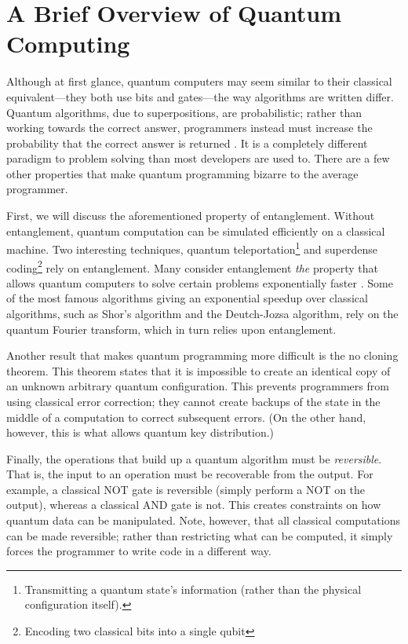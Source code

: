 \documentclass[]{article}
\begin{document}
\section{A Brief Overview of Quantum Computing}
Although at first glance, quantum computers may seem similar to their classical equivalent---they both use bits and gates---the way algorithms are written differ. Quantum algorithms, due to superpositions, are probabilistic; rather than working towards the correct answer, programmers instead must increase the probability that the correct answer is returned \cite{nannicini2017}. It is a completely different paradigm to problem solving than most developers are used to. There are a few other properties that make quantum programming bizarre to the average programmer.

First, we will discuss the aforementioned property of entanglement. Without entanglement, quantum computation can be simulated efficiently on a classical machine. Two interesting techniques, quantum teleportation\footnote{Transmitting a quantum state's information (rather than the physical configuration itself).} and superdense coding\footnote{Encoding two classical bits into a single qubit} rely on entanglement. Many consider entanglement \textit{the} property that allows quantum computers to solve certain problems exponentially faster \cite{jozsa2002}. Some of the most famous algorithms giving an exponential speedup over classical algorithms, such as Shor's algorithm and the Deutch-Jozsa algorithm, rely on the quantum Fourier transform, which in turn relies upon entanglement.

Another result that makes quantum programming more difficult is the no cloning theorem. This theorem states that it is impossible to create an identical copy of an unknown arbitrary quantum configuration. This prevents programmers from using classical error correction; they cannot create backups of the state in the middle of a computation to correct subsequent errors. (On the other hand, however, this is what allows quantum key distribution.)

Finally, the operations that build up a quantum algorithm must be \textit{reversible}. That is, the input to an operation must be recoverable from the output. For example, a classical NOT gate is reversible (simply perform a NOT on the output), whereas a classical AND gate is not. This creates constraints on how quantum data can be manipulated. Note, however, that all classical computations can be made reversible; rather than restricting what can be computed, it simply forces the programmer to write code in a different way.
\end{document}
